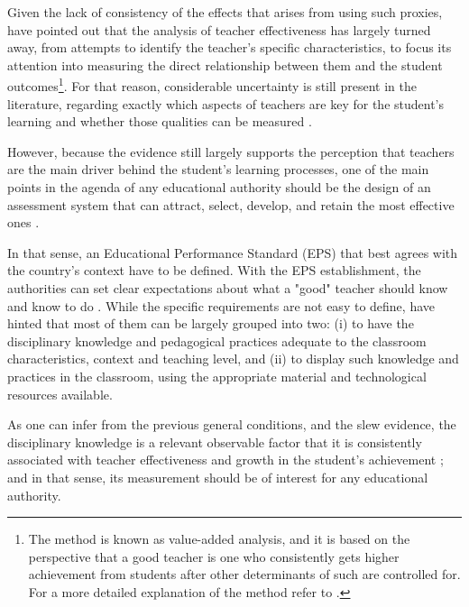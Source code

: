 Given the lack of consistency of the effects that arises from using such proxies, \citet{Hanushek_et_al_2012} have pointed out that the analysis of teacher effectiveness has largely turned away, from attempts to identify the teacher's specific characteristics, to focus its attention into measuring the direct relationship between them and the student outcomes\footnote{The method is known as value-added analysis, and it is based on the perspective that a good teacher is one who consistently gets higher achievement from students after other determinants of such are controlled for. For a more detailed explanation of the method refer to \citet{Scherrer_2011}.}. For that reason, considerable uncertainty is still present in the literature, regarding exactly which aspects of teachers are key for the student's learning and whether those qualities can be measured \citep{Rockoff_2004, Clotfelter_et_al_2006}.

However, because the evidence still largely supports the perception that teachers are the main driver behind the student's learning processes, one of the main points in the agenda of any educational authority should be the design of an assessment system that can attract, select, develop, and retain the most effective ones \citep{Elacqua_et_al_2018}. 

In that sense, an Educational Performance Standard (EPS) that best agrees with the country's context have to be defined. With the EPS establishment, the authorities can set clear expectations about what a "good" teacher should know and know to do \citep{Hincapie_et_al_2020}. While the specific requirements are not easy to define, \citeauthor{Hincapie_et_al_2020} have hinted that most of them can be largely grouped into two: (i) to have the disciplinary knowledge and pedagogical practices adequate to the classroom characteristics, context and teaching level, and (ii) to display such knowledge and practices in the classroom, using the appropriate material and technological resources available. 

As one can infer from the previous general conditions, and the slew evidence, the disciplinary knowledge is a relevant observable factor that it is consistently associated with teacher effectiveness and growth in the student's achievement \citep{Santibanez_2006, Clotfelter_et_al_2006, Clotfelter_et_al_2007, Hanushek_et_al_2006, Marshall_2009, Rockoff_et_al_2011, Kane_et_al_2011, Kane_et_al_2012, Ome_2012, Metzler_et_al_2012, Kane_et_al_2013, Araujo_et_al_2016, Bietenbeck_et_al_2018, Estrada_2019}; and in that sense, its measurement should be of interest for any educational authority.

